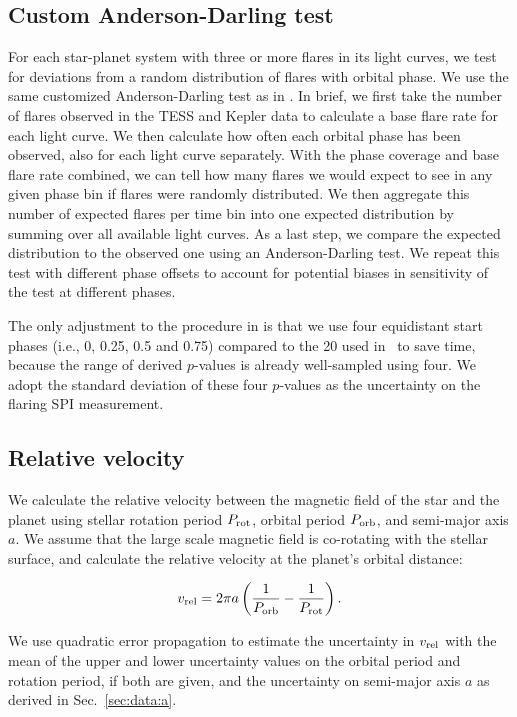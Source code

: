 \documentclass[twocolumn]{aastex631}
\begin{document}
\subsection{Custom Anderson-Darling test}
\label{sec:methods:adtest}
For each star-planet system with three or more flares in its light curves, we test for deviations from a random distribution of flares with orbital phase. We use the same customized Anderson-Darling test as in \cite{ilin2022searching}. In brief, we first take the number of flares observed in the TESS and Kepler data to calculate a base flare rate for each light curve. We then calculate how often each orbital phase has been observed, also for each light curve separately. With the phase coverage and base flare rate combined, we can tell how many flares we would expect to see in any given phase bin if flares were randomly distributed. We then aggregate this number of expected flares per time bin into one expected distribution by summing over all available light curves. As a last step, we compare the expected distribution to the observed one using an Anderson-Darling test. We repeat this test with different phase offsets to account for potential biases in sensitivity of the test at different phases.

The only adjustment to the procedure in \cite{ilin2022searching} is that we use four equidistant start phases (i.e., 0, 0.25, 0.5 and 0.75) compared to the 20 used in~\cite{ilin2022searching} to save time, because the range of derived $p$-values is already well-sampled using four. We adopt the standard deviation of these four $p$-values as the uncertainty on the flaring SPI measurement.



\subsection{Relative velocity}
\label{sec:methods:relvel}
We calculate the relative velocity between the magnetic field of the star and the planet using stellar rotation period $P_{\rm rot}$, orbital period $P_{\rm orb}$, and semi-major axis $a$. We assume that the large scale magnetic field is co-rotating with the stellar surface, and calculate the relative velocity at the planet's orbital distance:

\begin{equation}
    v_{\rm rel} = 2 \pi a \left(\frac{1}{P_{\rm orb}} - \frac{1}{P_{\rm rot}}\right).
\end{equation}

We use quadratic error propagation to estimate the uncertainty in $v_{\rm rel}$ with the mean of the upper and lower uncertainty values on the orbital period and rotation period, if both are given, and the uncertainty on semi-major axis $a$ as derived in Sec.~\ref{sec:data:a}. 
\end{document}
